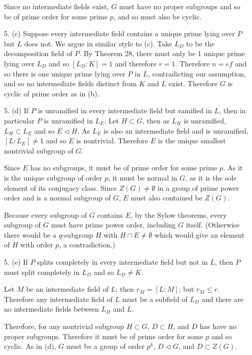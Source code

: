 \documentclass{article}
\begin{document}
\begin{enumerate}
    Since no intermediate fields exist, $G$ must have no proper subgroups and so be of prime order for some prime $p$, and so must also be cyclic.

    \item [5. (c)] Suppose every intermediate field contains a unique prime lying over $P$ but $L$ does not.  We argue in similar style to (c).  Take $L_D$ to be the decomposition field of $P$.  By Theorem 28, there must only be 1 unique prime lying over $L_D$ and so $[L_D : K] = 1$ and therefore $r = 1$.  Therefore $n = ef$ and so there is one unique prime lying over $P$ in $L$, contradicting our assumption, and so no intermediate fields distinct from $K$ and $L$ exist.  Therefore $G$ is cyclic of prime order as in (b).

    \item [5. (d)] If $P$ is unramified in every intermediate field but ramified in $L$, then in particular $P$ is unramified in $L_{E}$.  Let $H \subset G$, then as $L_{H}$ is unramified, $L_{H} \subset L_{E}$ and so $E \triangleleft H$.  As $L_{E}$ is also an intermediate field and is unramified, $[L : L_{E}] \neq 1$ and so $E$ is nontrivial.  Therefore $E$ is the unique smallest nontrivial subgroup of $G$.

    Since $E$ has no subgroups, it must be of prime order for some prime $p$.  As it is the unique subgroup of order $p$, it must be normal in $G$, as it is the sole element of its conjugacy class.  Since $Z(G) \neq \emptyset$ in a group of prime power order and is a normal subgroup of $G$, $E$ must also contained be $Z(G)$.

    Because every subgroup of $G$ contains $E$, by the Sylow theorems, every subgroup of $G$ must have prime power order, including $G$ itself.  (Otherwise there would be a $q$-subgroup $H$ with $H \cap E \neq \emptyset$ which would give an element of $H$ with order $p$, a contradiction.)

    \item [5. (e)] If $P$ splits completely in every intermediate field but not in $L$, then $P$ must split completely in $L_{D}$ and so $L_{D} \neq K$.

    Let $M$ be an intermediate field of $L$; then $r_{M} = [L : M]$; but $r_{M} \leq r$.  Therefore any intermediate field of $L$ must be a subfield of $L_{D}$ and there are no intermediate fields between $L_{D}$ and $L$.

    Therefore, for any nontrivial subgroup $H \subset G$, $D \subset H$, and $D$ has have no proper subgroups.  Therefore it must be of prime order for some $p$ and so cyclic.  As in (d), $G$ must be a group of order $p^k$, $D \triangleleft G$, and $D \subset Z(G)$.


\end{enumerate}
\end{document}
